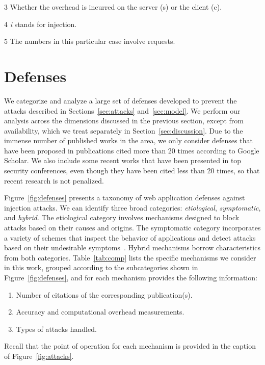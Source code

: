 \documentclass[10pt,journal,compsoc]{IEEEtran}
\begin{document}
\begin{table}[t]
\begin{threeparttable}
\begin{small}
\begin{tablenotes}
\begin{scriptsize}
    \item[3] Whether the overhead is incurred on the server ({\sc s}) or the client ({\sc c}). 
    \item[4] {\it i} stands for injection.
    \item[5] The numbers in this particular case involve requests.
  \end{scriptsize}
    \end{tablenotes}
    \end{small}
    \end{threeparttable}
    \vspace{-7mm}
\end{table}

\section{Defenses}
\label{sec:defs}
\vspace{-0.5mm}

We categorize and analyze a large set of defenses developed to prevent
the attacks described in Sections~\ref{sec:attacks} and~\ref{sec:model}.
We perform our analysis across
the dimensions discussed in the previous section,
except from availability, which we treat
separately in Section~\ref{sec:discussion}.
Due to the immense number of published works in the area, we only consider
defenses that have been proposed in publications cited more than
20 times according to Google Scholar.
We also include some recent works that have been
presented in top security conferences, even though they have been
cited less than 20 times, so that recent research is not penalized.

Figure~\ref{fig:defenses} presents a taxonomy of 
web application defenses against injection attacks.
We can identify three broad categories:
{\it etiological}, {\it symptomatic}, and {\it hybrid}.
The etiological category involves mechanisms designed to
block attacks based on their causes and origins. 
The symptomatic category incorporates a variety of schemes that
inspect the behavior of applications and detect attacks based on
their undesirable symptoms~\cite{D76,A00}.
Hybrid mechanisms borrow characteristics from both
categories. Table~\ref{tab:comp} lists the specific mechanisms we consider
in this work, grouped according to the subcategories shown in
Figure~\ref{fig:defenses}, and for each mechanism
provides the following information:

\vspace{-0.5mm}
\begin{enumerate}
\item Number of citations of the corresponding publication(s).
\item Accuracy and computational overhead measurements.
\item Types of attacks handled.
\end{enumerate}
\vspace{-0.5mm}
\noindent
Recall that the point of operation for each mechanism is provided
in the caption of Figure~\ref{fig:attacks}.
\end{document}
